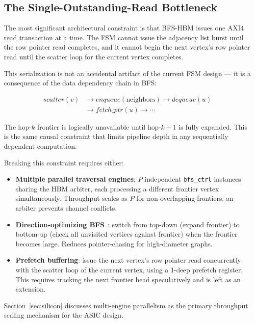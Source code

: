 \subsection{The Single-Outstanding-Read Bottleneck}

The most significant architectural constraint is that BFS-HBM issues one AXI4 read
transaction at a time. The FSM cannot issue the adjacency list burst until the row
pointer read completes, and it cannot begin the next vertex's row pointer read
until the scatter loop for the current vertex completes.

This serialization is not an accidental artifact of the current FSM design — it is
a consequence of the data dependency chain in BFS:

\begin{align*}
\mathit{scatter}(v) &\to \mathit{enqueue}(\text{neighbors}) \to \mathit{dequeue}(u) \\
                    &\to \mathit{fetch\_ptr}(u) \to \cdots
\end{align*}

The hop-$k$ frontier is logically unavailable until hop-$k-1$ is fully expanded.
This is the same causal constraint that limits pipeline depth in any sequentially
dependent computation.

Breaking this constraint requires either:
\begin{itemize}[leftmargin=*,itemsep=2pt]
\item \textbf{Multiple parallel traversal engines}: $P$ independent
  \texttt{bfs\_ctrl} instances sharing the HBM arbiter, each processing a
  different frontier vertex simultaneously. Throughput scales as $P$ for
  non-overlapping frontiers; an arbiter prevents channel conflicts.
\item \textbf{Direction-optimizing BFS}~\cite{beamer2012direction}: switch from
  top-down (expand frontier) to bottom-up (check all unvisited vertices against frontier)
  when the frontier becomes large. Reduces pointer-chasing for high-diameter graphs.
\item \textbf{Prefetch buffering}: issue the next vertex's row pointer read
  concurrently with the scatter loop of the current vertex, using a 1-deep
  prefetch register. This requires tracking the next frontier head speculatively
  and is left as an extension.
\end{itemize}

Section~\ref{sec:silicon} discusses multi-engine parallelism as the primary
throughput scaling mechanism for the ASIC design.
